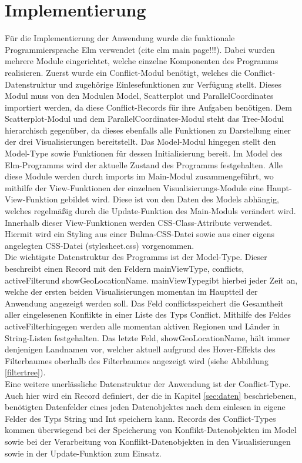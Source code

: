 \documentclass[usegeometry=true]{scrartcl}
\begin{document}
\section{Implementierung}
Für die Implementierung der Anwendung wurde die funktionale Programmiersprache Elm verwendet (cite elm main page!!!). Dabei wurden mehrere Module eingerichtet, welche einzelne Komponenten des Programms realisieren. Zuerst wurde ein Conflict-Modul benötigt, welches die Conflict-Datenstruktur und zugehörige Einlesefunktionen zur Verfügung stellt. Dieses Modul muss von den Modulen Model, Scatterplot und ParallelCoordinates importiert werden, da diese Conflict-Records für ihre Aufgaben benötigen. Dem Scatterplot-Modul und dem ParallelCoordinates-Modul steht das Tree-Modul hierarchisch gegenüber, da dieses ebenfalls alle Funktionen zu Darstellung einer der drei Visualisierungen bereitstellt. Das Model-Modul hingegen stellt den Model-Type sowie Funktionen für dessen Initialisierung bereit. Im Model des Elm-Programms wird der aktuelle Zustand des Programms festgehalten. Alle diese Module werden durch imports im Main-Modul zusammengeführt, wo mithilfe der View-Funktionen der einzelnen Visualisierungs-Module eine Haupt-View-Funktion gebildet wird. Diese ist von den Daten des Models abhängig, welches regelmäßig durch die Update-Funktion des Main-Moduls verändert wird. Innerhalb dieser View-Funktionen werden CSS-Class-Attribute verwendet. Hiermit wird ein Styling aus einer Bulma-CSS-Datei sowie aus einer eigens angelegten CSS-Datei (\glqq stylesheet.css\grqq) vorgenommen.\\

Die wichtigste Datenstruktur des Programms ist der Model-Type. Dieser beschreibt einen Record mit den Feldern \glqq mainViewType\grqq, \glqq conflicts\grqq, \glqq activeFilter\grqq und \glqq showGeoLocationName\grqq. \glqq mainViewType\grqq gibt hierbei jeder Zeit an, welche der ersten beiden Visualisierungen momentan im Hauptteil der Anwendung angezeigt werden soll. Das Feld \glqq conflicts\grqq speichert die Gesamtheit aller eingelesenen Konflikte in einer Liste des Typs \glqq Conflict\grqq. Mithilfe des Feldes \glqq activeFilter\grqq hingegen werden alle momentan aktiven Regionen und Länder in String-Listen festgehalten. Das letzte Feld, \glqq showGeoLocationName\grqq, hält immer denjenigen Landnamen vor, welcher aktuell aufgrund des Hover-Effekts des Filterbaumes oberhalb des Filterbaumes angezeigt wird (siehe Abbildung \ref{filtertree}).\\ Eine weitere unerlässliche Datenstruktur der Anwendung ist der Conflict-Type. Auch hier wird ein Record definiert, der die in Kapitel \ref{sec:daten} beschriebenen, benötigten Datenfelder eines jeden Datenobjektes nach dem einlesen in eigene Felder des Typs String und Int speichern kann. Records des Conflict-Types kommen überwiegend bei der Speicherung von Konflikt-Datenobjekten im Model sowie bei der Verarbeitung von Konflikt-Datenobjekten in den Visualisierungen sowie in der Update-Funktion zum Einsatz.\\
\end{document}
